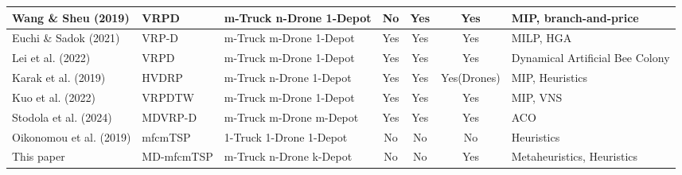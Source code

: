 \begin{table*}[]
{\begin{tabular}{@{}lllcccl@{}}
			Wang \& Sheu (2019) & VRPD & m-Truck n-Drone 1-Depot & No & Yes & Yes & MIP, branch-and-price \\
			\midrule
			Euchi \& Sadok (2021) & VRP-D & m-Truck m-Drone 1-Depot & Yes & Yes & Yes & MILP, HGA \\
			\midrule
			Lei et al. (2022) & VRPD & m-Truck m-Drone 1-Depot & Yes & Yes & Yes & Dynamical Artificial Bee Colony \\
			\midrule
			Karak et al. (2019) & HVDRP & m-Truck n-Drone 1-Depot & Yes & Yes & Yes(Drones) & MIP, Heuristics \\
			\midrule
			Kuo et al. (2022) & VRPDTW & m-Truck m-Drone 1-Depot & Yes & Yes & Yes & MIP, VNS \\
			\midrule
			Stodola et al. (2024) & MDVRP-D & m-Truck m-Drone m-Depot & Yes & Yes & Yes & ACO \\
			\midrule
			Oikonomou et al. (2019) & mfcmTSP & 1-Truck 1-Drone 1-Depot & No & No & No & Heuristics \\
			\midrule
			This paper & MD-mfcmTSP & m-Truck n-Drone k-Depot & No & No & Yes & Metaheuristics, Heuristics \\
			\bottomrule
		\end{tabular}%
	}
\end{table*}